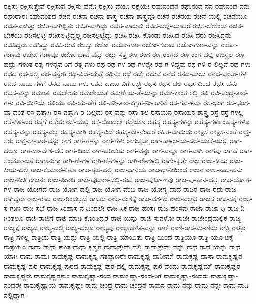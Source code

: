 {ರಕ್ಷಿಸು
ರಕ್ಷಿಸುತ್ತೇವೆ
ರಕ್ಷಿಸುವ
ರಕ್ಷಿಸು-ವೆನೊ
ರಕ್ಷಿಸು-ವೆಯೊ
ರಕ್ಷೆಯೇ
ರಘುನಂದನ
ರಘುನಂದ-ನನ
ರಘುನಂದ-ನನು
ರಘುರಾಈ
ರಘುವಂಶದ
ರಚನ
ರಚನಾ
ರಚನಾ-ಶಾಸ್ತ್ರ
ರಚನಾ-ಶಾಸ್ತ್ರವೂ
ರಚನೆ
ರಚನೆಯ
ರಚನೆ-ಯಲ್ಲಿ
ರಚನೆಯೂ
ರಚಿತ-ವಾಗಿತ್ತು
ರಚಿತ-ವಾಗಿದ್ದಿತು
ರಚಿತ-ವಾಗಿದ್ದು
ರಚಿತ-ವಾದುವು
ರಚಿಸ-ಬಲ್ಲೆ-ಯಾದರೆ
ರಚಿಸ-ಬೇಕೆಂದು
ರಚಿಸ-ಬೇಕೆಂಬ
ರಚಿಸಲ್ಪಟ್ಟ
ರಚಿಸಲ್ಪಟ್ಟಿದ್ದಲ್ಲ
ರಚಿಸಲ್ಪಟ್ಟಿದ್ದು
ರಚಿಸಿ
ರಚಿಸಿ-ಕೊಂಡು
ರಚಿಸಿದ
ರಚಿಸಿ-ದರು
ರಚಿಸಿದ್ದನು
ರಚಿಸಿದ್ದರು
ರಚಿಸಿದ್ದು
ರಚಿಸಿ-ರುವ
ರಜಸ್ಸು
ರಜೋ
ರಜೋ-ಗುಣ
ರಜೋ-ಗುಣದ
ರಜೋ-ಗುಣ-ವನ್ನು
ರಜೋ-ಗುಣವು
ರಜೋ-ಗುಣವೂ
ರಜೋ-ಭಾವ-ವನ್ನು
ರಜ್ಜು-ಸತ್ತೆ
ರಣ-ರಂಗ
ರಣ-ರಂಗದ
ರಣ-ರಂಗ-ದಲ್ಲಿ
ರಣಸ್ಥಲ
ರಣ-ಹದ್ದು-ಗಳಂತೆ
ರತ್ನ-ಗಳನ್ನವ-ರಿಗೆ
ರತ್ನ-ಗಳು
ರಥ
ರಥ-ಗಳ
ರಥ-ಗಳನ್ನೇ
ರಥ-ಗ-ಳಿದ್ದವು
ರಥ-ಗಳಿ-ರ-ಲಿಲ್ಲವೆ
ರಥ-ಗಳು
ರಥದ
ರಥ-ದಲ್ಲಿ
ರಥ-ವನ್ನೇರಿ
ರಥ-ವಿದೆ-ಯಷ್ಟೆ
ರಥಿನಂ
ರಥೆ
ರಥೇ
ರದುವೆ
ರನದ
ರನದ-ಬಾಬು
ರನದ-ಬಾಬು-ಗಳ
ರನದ-ಬಾಬು-ಗಳಿಗೆ
ರನದ-ಬಾಬು-ಗಳು
ರನದ-ಬಾಬು-ವಿಗೆ
ರಫ್ತು
ರಭಸ
ರಭಸ-ದಲಿ
ರಭಸ-ದಿಂದ
ರಭಸ-ವನು
ರಭಸ-ವನ್ನು
ರಮಂತಃ
ರಮಣೀಯ
ರಮಣೀಯತೆ
ರಮಣೀಯ-ತೆ-ಯನ್ನು
ರಮಾ-ಕಾಂತ
ರಲ್ಲಿ
ರವಿ
ರವಿ-ಚಂದ್ರ-ತಾರೆ-ಗಳು
ರವಿ-ಯಿಳಿಯೆ
ರವಿಯು
ರವಿ-ಯೆ-ಡೆಗೆ
ರವಿ-ಶಶಿ-ತಾರ-ಕಗ್ರಹ-ನೀ-ಹಾರಿಕೆ
ರಸ-ಗವ-ಳವೂ
ರಸ-ಭಂಗ
ರಸ-ಭಂಗ-ವಾ-ದಂತೆ
ರಸ-ವತ್ತಾಗಿ
ರಸ-ವತ್ತಾಗಿ-ರ-ಬಲ್ಲದು
ರಸ-ವನ್ನು
ರಸಾ-ತಲ
ರಸಾಯನ
ರಸಾಯನ-ಶಾಸ್ತ್ರ
ರಸ್ತೆ
ರಸ್ತೆ-ಗಳಲ್ಲಿ
ರಸ್ತೆ-ಗಿಳಿ-ದರೆ
ರಸ್ತೆಗೆ
ರಸ್ತೆಯ
ರಸ್ತೆ-ಯಲ್ಲಿ
ರಸ್ತೆ-ಯಿಂದಲೇ
ರಸ್ತೆಯೂ
ರಹಸ್ಯ
ರಹಸ್ಯ-ಗಳನ್ನು
ರಹಸ್ಯ-ಗಳು
ರಹಸ್ಯ-ಗಳೂ
ರಹಸ್ಯ-ವನ್ನು
ರಹಸ್ಯ-ವಲ್ಲ
ರಹಸ್ಯ-ವಾಗಿ
ರಹಸ್ಯ-ವಿದೆ
ರಹಸ್ಯ-ವೇ-ನೆಂದರೆ
ರಹಿತ-ವಾದುದು
ರಾಕ್ಷಸ
ರಾಕ್ಷಸ-ನಂತೆ
ರಾಕ್ಷ-ಸರು
ರಾಕ್ಷ-ಸಾ-ಕಾರ-ವನ್ನು
ರಾಗ
ರಾಗ-ಗಳನ್ನು
ರಾಗ-ಗಳು
ರಾಗಚ್ಛಟಾ
ರಾಗ-ತಾಳಲ-ಯ-ದಲೆ-ಯಲೆ-ಯಲ್ಲಿ
ರಾಗ-ದಲ್ಲೂ
ರಾಗ-ದಾ-ವೇಶ-ದಲಿ
ರಾಗ-ದಿಂದ
ರಾಗ-ಪರಿಚಯ
ರಾಗ-ವನ್ನು
ರಾಗ-ವನ್ನೂ
ರಾಗ-ವಾಗಿ
ರಾಗವು
ರಾಗವೆ
ರಾಗ-ಸಂಯೋ-ಜನೆ
ರಾಗಾನುಗಾ
ರಾಗಿ-ಣಿ-ಗಳ
ರಾಗಿ-ಣಿ-ಗಳನ್ನು
ರಾಗಿ-ಣಿ-ಗಳಲ್ಲಿ
ರಾಗೇ-ಕೃತೇ
ರಾಜ
ರಾಜ-ಕೀಯ
ರಾಜ-ಕೀಯ-ದಲ್ಲಿ
ರಾಜ-ಕುಮಾರ-ನಿಗೂ
ರಾಜ-ಗೃಹ-ದಲ್ಲಿ
ರಾಜ-ಧಾನಿಯ
ರಾಜ-ಧಾನಿಯಿಂದ
ರಾಜನ
ರಾಜ-ನಾದ-ವನು
ರಾಜ-ನೀತಿ
ರಾಜನು
ರಾಜ-ಪೀಠದಿ
ರಾಜ-ಪುಟಾಣ-ದಲ್ಲಿ-ರುವ
ರಾಜ-ಪುಟಾ-ಣವು
ರಾಜ-ಪು-ತಾನ-ದಲ್ಲಿ
ರಾಜ-ಯೋಗ-ಗಳ
ರಾಜ-ಯೋಗದ
ರಾಜ-ಯೋಗ-ದಲ್ಲಿ
ರಾಜ-ಯೋಗ-ವೆಂಬ
ರಾಜ-ಯೋಗ್ಯ-ವಾದ
ರಾಜರ
ರಾಜ-ರದು
ರಾಜ-ರಾಗಿದ್ದರು
ರಾಜ-ರಾದ
ರಾಜ-ರಿಂದಲ್ಲದೆ
ರಾಜರು
ರಾಜ-ವಂಶಕ್ಕೆ
ರಾಜ-ವರ್ಗದ
ರಾಜ-ವಲ್ಲಭ
ರಾಜಸ
ರಾಜ-ಸಕ್ಕೆ
ರಾಜ-ಸ-ಗುಣ
ರಾಜ-ಸಭೆ
ರಾಜ-ಸಿಂಹಾಸ-ನ-ದಿಂದಲೇ
ರಾಜ-ಸಿಕ
ರಾಜ-ಹಂಸಃ
ರಾಜ-ಹಂಸವು
ರಾಜಾ
ರಾಜಾ-ಧಿ-ರಾಜ-ನಿ-ಗಿಂತಲೂ
ರಾಜಿ
ರಾಜಿಗೆ
ರಾಜಿ-ಮಾಡಿ-ಕೊಂಡಿದ್ದರೆ
ರಾಜಿ-ಯನ್ನು
ರಾಜಿ-ಸುವಳೋ
ರಾಜೇ
ರಾಜೇಂದ್ರಮಲ್ಲಿಕ
ರಾಜ್ಯ
ರಾಜ್ಯಕ್ಕೆ
ರಾಜ್ಯದ
ರಾಜ್ಯ-ದಲ್ಲಿ
ರಾಜ್ಯ-ದಲ್ಲೂ
ರಾಜ್ಯವು
ರಾಜ್ಯಾಡಳಿತ-ವನ್ನು
ರಾಣಿ
ರಾಣಿ-ರಾಸ-ಮ-ಣಿಯ
ರಾತ್ರಿ
ರಾತ್ರಿಂ
ರಾತ್ರಿ-ಗಳಲ್ಲ
ರಾತ್ರಿಯ
ರಾತ್ರಿ-ಯನ್ನು
ರಾತ್ರಿ-ಯಲ್ಲಿ
ರಾತ್ರಿ-ಯಾಯಿತು
ರಾತ್ರಿ-ಯಿಂದ
ರಾತ್ರಿಯೂ
ರಾತ್ರಿ-ಯೂ-ಟಕ್ಕೆ
ರಾತ್ರೆಯೂ
ರಾಧಾ
ರಾಧಾ-ಕಾಂತ
ರಾಧಾ-ಕೃಷ್ಣರ
ರಾಧಾಪ್ರೇಮ-ದಲ್ಲಿ
ರಾಧಾಪ್ರೇಮ-ವನ್ನು
ರಾಧೆ
ರಾಧೆ-ಯನ್ನು
ರಾಧೆ-ಯಾಗಿ
ರಾಮ
ರಾಮಃ
ರಾಮಕೃಷ್ಣ
ರಾಮಕೃಷ್ಣ-ಗತಪ್ರಾಣರೇ
ರಾಮಕೃಷ್ಣ-ದಾನೀಮ್
ರಾಮಕೃಷ್ಣ-ದಾಸಾ
ರಾಮಕೃಷ್ಣನ
ರಾಮಕೃಷ್ಣ-ಪುರ
ರಾಮಕೃಷ್ಣ-ಪುರದ
ರಾಮಕೃಷ್ಣ-ಪುರ-ದಲ್ಲಿ
ರಾಮಕೃಷ್ಣ-ಪುರ-ವೆಂದು
ರಾಮಕೃಷ್ಣಮ್
ರಾಮಕೃಷ್ಣರ
ರಾಮಕೃಷ್ಣರು
ರಾಮಕೃಷ್ಣಸ್ತನುಂ
ರಾಮಕೃಷ್ಣಾ-ನಂದ
ರಾಮಕೃಷ್ಣಾ-ನಂದ-ರಿಗೆ
ರಾಮಕೃಷ್ಣಾ-ನಂದರು
ರಾಮಕೃಷ್ಣಾ-ನಂದರೇ
ರಾಮಕೃಷ್ಣಾಯ
ರಾಮಕೃಷ್ಣೇ
ರಾಮ-ಚಂದ್ರ
ರಾಮ-ಚಂದ್ರನ
ರಾಮನ
ರಾಮ-ನನ್ನು
ರಾಮ-ನನ್ನೇ
ರಾಮ-ನಾಡಿ-ನಲ್ಲಿದ್ದಾಗ
}
